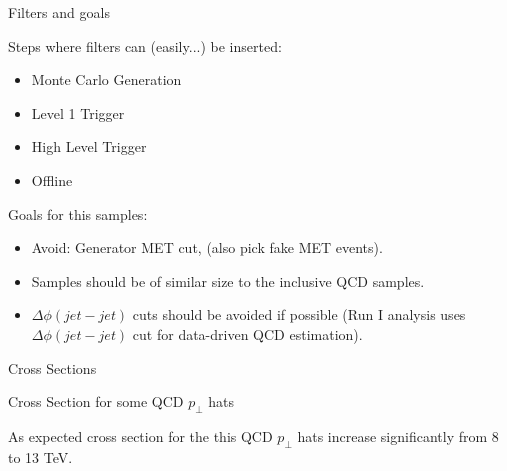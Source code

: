 \documentclass[8pt]{beamer}
\begin{document}
\begin{frame}{Filters and goals}
 
Steps where filters can (easily...) be inserted:

\begin{block}

\begin{itemize}
 \item Monte Carlo Generation
 \item Level 1 Trigger
 \item High Level Trigger
 \item Offline
\end{itemize}

\end{block}
 
Goals for this samples:

\begin{block}

\begin{itemize}
  \item Avoid: Generator MET cut, (also pick fake MET events).
  \item Samples should be of similar size to the inclusive QCD samples.
  \item $\Delta\phi(jet-jet)$ cuts should be avoided if possible (Run I analysis uses $\Delta\phi(jet-jet)$ cut for data-driven QCD estimation).
\end{itemize}

\end{block}

\end{frame}


\begin{frame}{Cross Sections}

\begin{block}{Cross Section for some QCD $p_\perp$ hats}
  


\end{block}
  
As expected cross section for the this QCD $p_\perp$ hats increase significantly from 8 to 13 TeV.
  
\end{frame}
\end{document}
